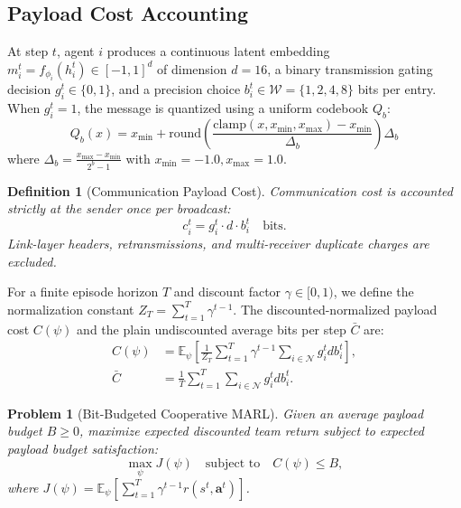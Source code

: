 \documentclass[10pt,twocolumn,letterpaper]{article}
\newtheorem{definition}{Definition}
\newtheorem{problem}{Problem}
\begin{document}
\subsection{Payload Cost Accounting}
At step $t$, agent $i$ produces a continuous latent embedding $m_i^t = f_{\phi_i}(h_i^t) \in [-1, 1]^d$ of dimension $d=16$, a binary transmission gating decision $g_i^t \in \{0, 1\}$, and a precision choice $b_i^t \in \mathcal{W} = \{1, 2, 4, 8\}$ bits per entry. 
When $g_i^t = 1$, the message is quantized using a uniform codebook $Q_b$:
\begin{equation}
    Q_b(x) = x_{\min} + \mathrm{round}\left( \frac{\mathrm{clamp}(x, x_{\min}, x_{\max}) - x_{\min}}{\Delta_b} \right) \Delta_b
\end{equation}
where $\Delta_b = \frac{x_{\max} - x_{\min}}{2^b - 1}$ with $x_{\min} = -1.0, x_{\max} = 1.0$.

\begin{definition}[Communication Payload Cost]
Communication cost is accounted strictly at the sender once per broadcast:
\begin{equation}
    c_i^t = g_i^t \cdot d \cdot b_i^t \quad \text{bits}.
\end{equation}
Link-layer headers, retransmissions, and multi-receiver duplicate charges are excluded.
\end{definition}

For a finite episode horizon $T$ and discount factor $\gamma \in [0, 1)$, we define the normalization constant $Z_T = \sum_{t=1}^T \gamma^{t-1}$. The discounted-normalized payload cost $C(\psi)$ and the plain undiscounted average bits per step $\bar{C}$ are:
\begin{align}
    C(\psi) &= \mathbb{E}_{\psi} \left[ \frac{1}{Z_T} \sum_{t=1}^T \gamma^{t-1} \sum_{i \in \mathcal{N}} g_i^t d b_i^t \right], \\
    \bar{C} &= \frac{1}{T} \sum_{t=1}^T \sum_{i \in \mathcal{N}} g_i^t d b_i^t.
\end{align}

\begin{problem}[Bit-Budgeted Cooperative MARL]
Given an average payload budget $B \ge 0$, maximize expected discounted team return subject to expected payload budget satisfaction:
\begin{equation}
    \max_{\psi} J(\psi) \quad \text{subject to} \quad C(\psi) \le B,
\end{equation}
where $J(\psi) = \mathbb{E}_{\psi} \left[ \sum_{t=1}^T \gamma^{t-1} r(s^t, \mathbf{a}^t) \right]$.
\end{problem}
\end{document}
